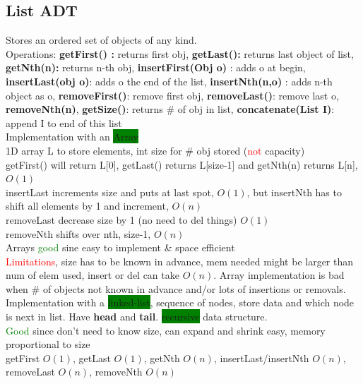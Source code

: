 \subsection{List ADT} Stores an ordered set of objects of any kind. 
\\Operations: \textbf{getFirst() :} returns first obj, \textbf{getLast():} returns last object of list, \textbf{getNth(n):} returns n-th obj, \textbf{insertFirst(Obj o)} : adds o at begin, \textbf{insertLast(obj o)}: adds o the end of the list,\textbf{ insertNth(n,o)} : adds n-th object as o,\textbf{ removeFirst()}: remove first obj, \textbf{removeLast()}: remove last o, \textbf{removeNth(n)}, \textbf{getSize()}: returns \# of obj in list, \textbf{concatenate(List I)}: append I to end of this list
\\ Implementation with an \colorbox{Green}{Array}
\\ 1D array L to store elements, int size for \# obj stored (\textcolor{Red}{not} capacity)
\\ getFirst() will return L[0], getLast() returns L[size-1] and getNth(n) returns L[n], $O(1)$
\\ insertLast increments size and puts at last spot, $O(1)$, but insertNth has to shift all elements by 1 and increment, $O(n)$
\\removeLast decrease size by 1 (no need to del things) $O(1)$
\\removeNth shifts over nth, size-1, $O(n)$
\\ Arrays \textcolor{Green}{good} sine easy to implement \& space efficient
\\ \textcolor{Red}{Limitations}, size has to be known in advance, mem needed might be larger than num of elem used, insert or del can take $O(n)$. Array implementation is bad when \# of objects not known in advance and/or lots of insertions or removals.
\\ Implementation with a \colorbox{Green}{linked-list}, sequence of nodes, store data and which node is next in list. Have \textbf{head} and \textbf{tail}. \colorbox{Green}{recursive} data structure.
\\ \textcolor{Green}{Good} since don't need to know size, can expand and shrink easy, memory proportional to size
\\ getFirst $O(1)$, getLast $O(1)$, getNth $O(n)$, insertLast/insertNth $O(n)$, removeLast $O(n)$, removeNth $O(n)$ 

